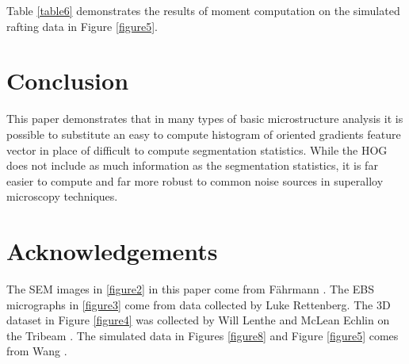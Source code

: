 \documentclass[review]{elsarticle}
\begin{document}
	Table \ref{table6} demonstrates the results of moment computation on the simulated rafting data in Figure \ref{figure5}.
	
	\section{Conclusion}
	
	This paper demonstrates that in many types of basic microstructure analysis it is possible to substitute an easy to compute histogram of oriented gradients feature vector in place of difficult to compute segmentation statistics. While the HOG does not include as much information as the segmentation statistics, it is far easier to compute and far more robust to common noise sources in superalloy microscopy techniques.
	
	\section{Acknowledgements}
	
	The SEM images in \ref{figure2} in this paper come from F\"ahrmann \cite{faehrmann}. The EBS micrographs in \ref{figure3} come from data collected by Luke Rettenberg. The 3D dataset in Figure \ref{figure4} was collected by Will Lenthe and McLean Echlin on the Tribeam \cite{tribeam}. The simulated data in Figures \ref{figure8} and Figure \ref{figure5} comes from Wang \cite{ywang2}.

	
\end{document}
